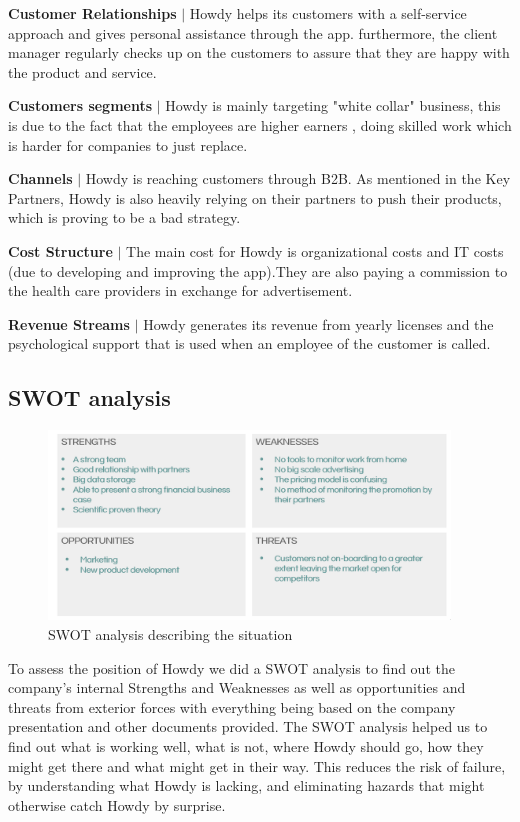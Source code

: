 \noindent \textbf{Customer Relationships} $|$ Howdy helps its customers with a self-service approach and gives personal assistance through the app. furthermore, the client manager regularly checks up on the customers to assure that they are happy with the product and service.

\noindent \textbf{Customers segments} $|$ Howdy is mainly targeting "white collar" business, this is due to the fact that the employees are higher earners , doing skilled work which is harder for companies to just replace.

\noindent \textbf{Channels} $|$ Howdy is reaching customers through B2B. As mentioned in the Key Partners, Howdy is also heavily relying on their partners to push their products, which is proving to be a bad strategy. 

\noindent \textbf{Cost Structure} $|$ The main cost for Howdy is organizational costs and IT costs (due to developing and improving the app).They are also paying a commission to the health care providers in exchange for advertisement. 

\noindent \textbf{Revenue Streams} $|$ Howdy generates its revenue from yearly licenses and the psychological support that is used when an employee of the customer is called.


\subsection{SWOT analysis}

\begin{figure}[H]
\centering
\includegraphics[width=0.95\textwidth]{figures/SWOT.png}
\caption{SWOT analysis describing the situation}
\end{figure}
To assess the position of Howdy we did a SWOT analysis to find out the company’s internal Strengths and Weaknesses as well as opportunities and threats from exterior forces with everything being based on the company presentation and other documents provided. The SWOT analysis helped us to find out what is working well, what is not, where Howdy should go, how they might get there and what might get in their way. This reduces the risk of failure, by understanding what Howdy is lacking, and eliminating hazards that might otherwise catch Howdy by surprise.

